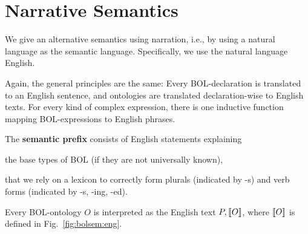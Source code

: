 \section{Narrative Semantics}\label{sec:bolsem:narr}

We give an alternative semantics using narration, i.e., by using a natural language as the semantic language.
Specifically, we use the natural language English.

Again, the general principles are the same:
Every BOL-declaration is translated to an English sentence, and ontologies are translated declaration-wise to English texts.
For every kind of complex expression, there is one inductive function mapping BOL-expressions to English phrases.

\begin{definition}\label{def:bolsem:eng}
The \textbf{semantic prefix} consists of English statements explaining
\begin{compactitem}
 \item the base types of BOL (if they are not universally known),
 \item that we rely on a lexicon to correctly form plurals (indicated by -s) and verb forms (indicated by -s, -ing, -ed).
\end{compactitem}

Every BOL-ontology $O$ is interpreted as the English text $P,\llbracket O\rrbracket$, where $\llbracket O\rrbracket$ is defined in Fig.~\ref{fig:bolsem:eng}.
\end{definition}



